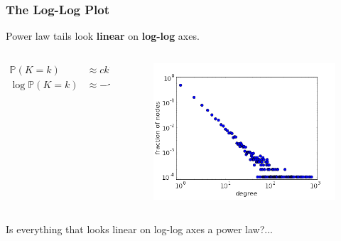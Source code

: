 \documentclass{beamer}
\newcommand\prob[0]{\mathbb{P}}
\begin{document}
		
		\begin{frame}\frametitle{The Log-Log Plot}
		  	Power law tails look \textbf{linear} on \textbf{log-log} axes. 
		  	\begin{columns}
		  		\begin{column}{.45\textwidth}
		  			\begin{align*}
		  				\prob(K = k) &\approx c k^{-\gamma} \\ 
		  				\log \prob(K = k) &\approx -\gamma \log k + \log c\;.
		  			\end{align*}
		  		\end{column}
			  	\begin{column}{.55\textwidth}
			  	\begin{figure}
			  		\centering
			  		\includegraphics[width=\textwidth]{pl_scatter}
			  		\caption{} \label{fig:}
			  	\end{figure}
			  	\end{column}
		  	\end{columns}
		  	Is everything that looks linear on log-log axes a power law?...
		\end{frame}
	
		
\end{document}
